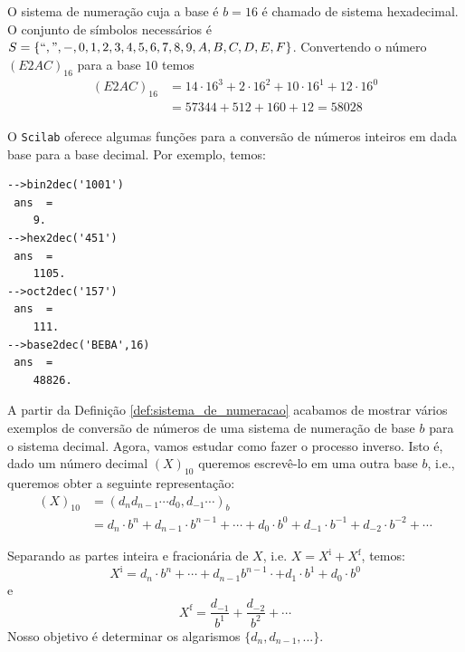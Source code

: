\begin{ex} O sistema de numeração cuja a base é $b=16$ é chamado de sistema hexadecimal. O conjunto de símbolos necessários é  $S=\{``,", -, 0, 1, 2, 3, 4, 5, 6, 7, 8, 9, A, B, C, D, E, F\}$. Convertendo o número $(E2AC)_{16}$ para a base $10$ temos
\begin{equation*}
  \begin{split}
  (E2AC)_{16} &= 14\cdot 16^3+2\cdot 16^2+10\cdot 16^1+12\cdot 16^{0}\\
  &=57344+512+160+12=58028  
  \end{split}
\end{equation*}
\end{ex}

\ifisscilab
\begin{ex}[Scilab]
  O \verb+Scilab+ oferece algumas funções para a conversão de números inteiros em dada base para a base decimal. Por exemplo, temos:
\begin{verbatim}
-->bin2dec('1001')
 ans  =
    9.  
-->hex2dec('451')
 ans  =
    1105.  
-->oct2dec('157')
 ans  =
    111.
-->base2dec('BEBA',16)
 ans  =
    48826.  
\end{verbatim}
\end{ex}
\fi

A partir da Definição \ref{def:sistema_de_numeracao} acabamos de mostrar vários exemplos de conversão de números de uma sistema de numeração de base $b$ para o sistema decimal. Agora, vamos estudar como fazer o processo inverso. Isto é, dado um número decimal $(X)_{10}$ queremos escrevê-lo em uma outra base $b$, i.e., queremos obter a seguinte representação:
\begin{equation*}
  \begin{split}
    (X)_{10} &= (d_nd_{n-1}\cdots d_0,d_{-1}\cdots)_{b} \\
    &= d_n\cdot b^{n}+d_{n-1}\cdot b^{n-1}+\cdots + d_0\cdot b^0+d_{-1}\cdot b^{-1}+d_{-2}\cdot b^{-2}+\cdots          
  \end{split}
\end{equation*}

Separando as partes inteira e fracionária de $X$, i.e. $X = X^{\mbox{i}} + X^{\mbox{f}}$, temos:
\begin{equation*}
X^{\mbox{i}} = d_n\cdot b^{n}+ \cdots+d_{n-1}b^{n-1} \cdot  +d_1\cdot b^1 +d_0\cdot b^0
\end{equation*}
e
\begin{equation*}
  X^{\mbox{f}} = \frac{d_{-1}}{b^1} + \frac{d_{-2}}{b^{2}} + \cdots
\end{equation*}
Nosso objetivo é determinar os algarismos $\{d_n, d_{n-1}, ...\}$. 

